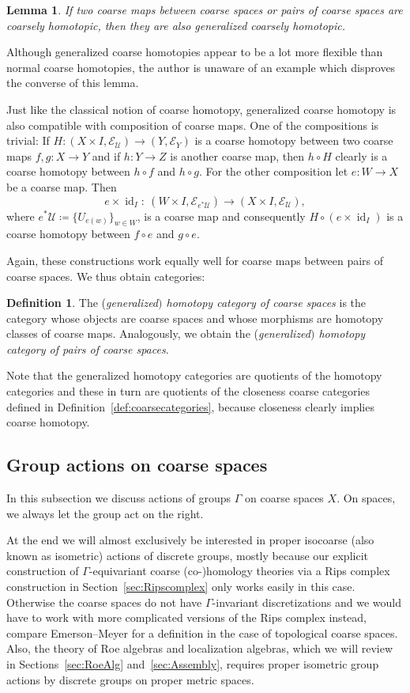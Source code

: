 \documentclass[pdftex]{sigma}
\numberwithin{equation}{section}
\newtheorem{lem}[thm]{Lemma}
\theoremstyle{definition}
\newtheorem{defn}[thm]{Definition}
\newcommand{\cU}{\mathcal{U}}
\newcommand{\coarseStr}{\mathcal{E}}
\DeclareMathOperator{\id}{id}
\begin{document}
\begin{lem}
If two coarse maps between coarse spaces or pairs of coarse spaces are coarsely homotopic, then they are also generalized coarsely homotopic.
\end{lem}

Although generalized coarse homotopies appear to be a lot more flexible than normal coarse homotopies, the author is unaware of an example which disproves the converse of this lemma.

Just like the classical notion of coarse homotopy, generalized coarse homotopy is also compatible with composition of coarse maps. One of the compositions is trivial: If $H\colon(X\times I,\coarseStr_\cU)\to (Y,\coarseStr_Y)$ is a coarse homotopy between two coarse maps $f,g\colon X\to Y$ and if $h\colon Y\to Z$ is another coarse map, then $h\circ H$ clearly is a coarse homotopy between $h\circ f$ and $h\circ g$. For the other composition let $e\colon W\to X$ be a coarse map. Then
\[
e\times\id_I\colon\ (W\times I,\coarseStr_{e^*\cU})\to (X\times I,\coarseStr_\cU),
\]
where $e^*\cU\coloneqq\{U_{e(w)}\}_{w\in W}$, is a coarse map and consequently $H\circ (e\times\id_I)$ is a coarse homotopy between $f\circ e$ and $g\circ e$.

Again, these constructions work equally well for coarse maps between pairs of coarse spaces. We thus obtain categories:

\begin{defn}
The (\emph{generalized$)$ homotopy category of coarse spaces} is the category whose objects are coarse spaces and whose morphisms are homotopy classes of coarse maps.
Analogously, we obtain the (\emph{generalized$)$ homotopy category of pairs of coarse spaces}.
\end{defn}

Note that the generalized homotopy categories are quotients of the homotopy categories and these in turn are quotients of the closeness coarse categories defined in Definition~\ref{def:coarsecategories}, because closeness clearly implies coarse homotopy.


\subsection{Group actions on coarse spaces}
In this subsection we discuss actions of groups $\Gamma$ on coarse spaces $X$. On spaces, we always let the group act on the right.

At the end we will almost exclusively be interested in proper isocoarse (also known as isometric) actions of discrete groups, mostly because our explicit construction of $\Gamma$-equivariant coarse \mbox{(co-)}homology theories via a Rips complex construction in Section~\ref{sec:Ripscomplex} only works easily in this case.
Otherwise the coarse spaces do not have $\Gamma$-invariant discretizations and we would have to work with more complicated versions of the Rips complex instead, compare Emerson--Meyer \cite[Section~2.4]{EmeMeyDescent} for a definition in the case of topological coarse spaces.
Also, the theory of Roe algebras and localization algebras, which we will review in Sections~\ref{sec:RoeAlg} and~\ref{sec:Assembly}, requires proper isometric group actions by discrete groups on proper metric spaces.
\end{document}
